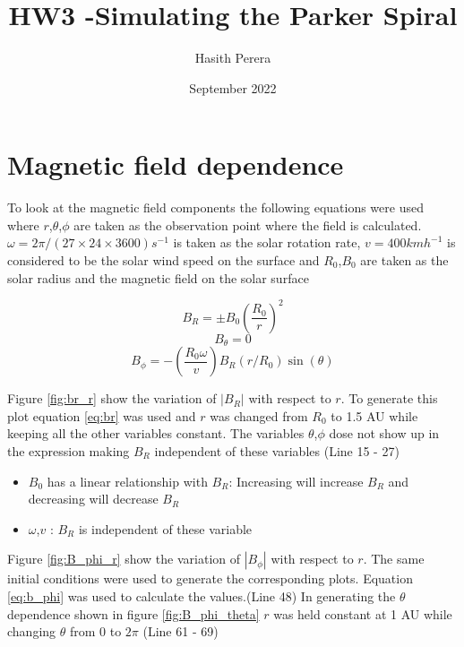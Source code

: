 \documentclass[letterpaper,skipsamekey,12pt,english]{article}
\title{HW3 -Simulating the Parker Spiral }
\author{Hasith Perera}
\date{September 2022}
\begin{document}
\maketitle
\thispagestyle{fancy}

\section{Magnetic field dependence}

To look at the magnetic field components the following equations were used where $r$,$\theta$,$\phi$ are taken as the observation point where the field is calculated. $\omega = 2\pi/(27\times24\times3600) s^{-1}$ is taken as the solar rotation rate, $v = 400 kmh^{-1}$ is considered to be the solar wind speed on the surface and $R_0$,$B_0$ are taken as the solar radius and the magnetic field on the solar surface

\begin{equation}
\label{eq:br}
    B_R = \pm B_0\left(\frac{R_0}{r}\right)^2
\end{equation}
\begin{equation}
    B_{\theta} = 0
\end{equation}
\begin{equation}
\label{eq:b_phi}
    B_{\phi} = - \left(\frac{R_0 \omega}{v}\right) B_R (r/R_0) \sin(\theta)
\end{equation}

Figure \ref{fig:br_r} show the variation of $|B_R|$ with respect to $r$. To generate this plot equation \ref{eq:br} was used and $r$ was changed from $R_0$ to 1.5 AU while keeping all the other variables constant. The variables $\theta$,$\phi$ dose not show up in the expression making $B_R$ independent of these variables  (Line 15 - 27)

\begin{itemize}[noitemsep]
    \item $B_0$ has a linear relationship with $B_R$: Increasing will increase $B_R$ and decreasing will decrease $B_R$
    \item $\omega$,$v$ :  $B_R$ is independent of these variable
\end{itemize}

Figure \ref{fig:B_phi_r} show the variation of $|B_\phi|$  with respect to $r$. The same initial conditions were used to generate the corresponding plots. Equation \ref{eq:b_phi} was used to calculate the values.(Line 48) In generating the $\theta$ dependence shown in figure \ref{fig:B_phi_theta} $r$ was held constant at 1 AU while changing $\theta$ from 0 to $2\pi$ (Line 61 - 69)
\end{document}
